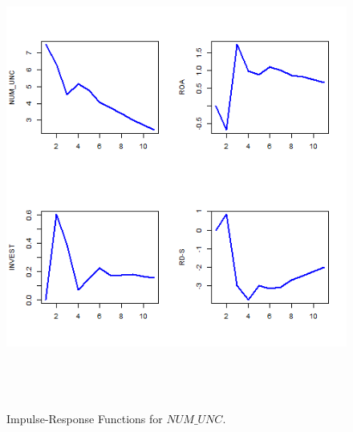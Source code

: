 \begin{figure}[H] 
\centering
\includegraphics[width=6in, height=6in]{figures/nunc-irf-2}
\captionsetup{justification=centering, width=.95\textwidth} 
\caption{\footnotesize Impulse-Response Functions for $NUM\_UNC$.} \label{nunc-irf-2}
\end{figure} 
 \newpage
